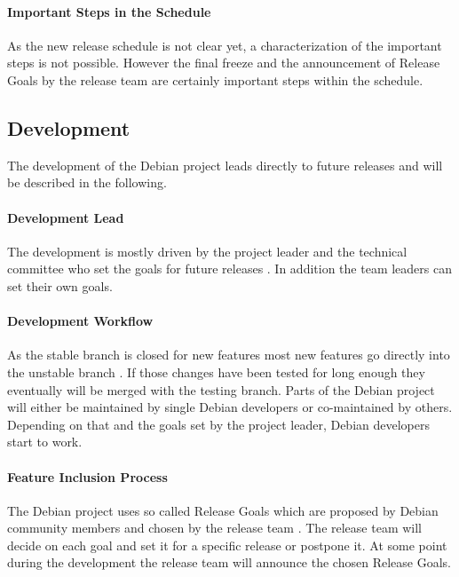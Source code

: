 \paragraph{Important Steps in the Schedule}

As the new release schedule is not clear yet, a characterization of the
important steps is not possible. However the final freeze and the announcement
of Release Goals by the release team are certainly important steps within the
schedule.

\subsection{Development}

The development of the Debian project leads directly to future releases and
will be described in the following.

\paragraph{Development Lead}

The development is mostly driven by the project leader and the technical
committee who set the goals for future releases \cite{DebianOrg}. In addition
the team leaders can set their own goals.

\paragraph{Development Workflow}

As the stable branch is closed for new features most new features go directly
into the unstable branch \cite{DebianFAQ,DebianDev,DebianReleaseManagement}. If
those changes have been tested for long enough they eventually will be merged
with the testing branch. Parts of the Debian project will either be maintained
by single Debian developers or co-maintained by others. Depending on that and
the goals set by the project leader, Debian developers start to work.

\paragraph{Feature Inclusion Process}

The Debian project uses so called Release Goals which are proposed by Debian
community members and chosen by the release team
\cite{DebianReleaseGoals,McGovern2011}. The release team will decide on each
goal and set it for a specific release or postpone it. At some point during the
development the release team will announce the chosen Release Goals.


